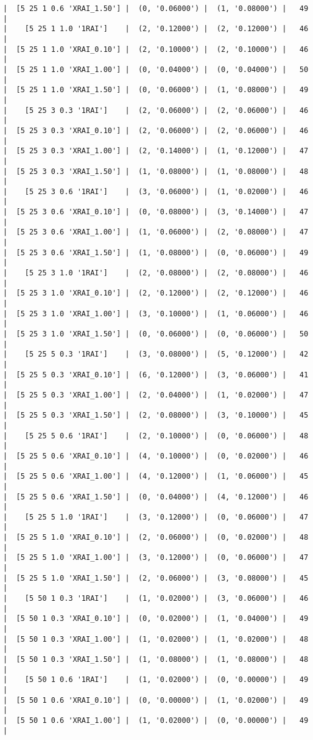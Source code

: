 \documentclass{article}
\begin{document}
\begin{verbatim}
|  [5 25 1 0.6 'XRAI_1.50'] |  (0, '0.06000') |  (1, '0.08000') |   49  |
|    [5 25 1 1.0 '1RAI']    |  (2, '0.12000') |  (2, '0.12000') |   46  |
|  [5 25 1 1.0 'XRAI_0.10'] |  (2, '0.10000') |  (2, '0.10000') |   46  |
|  [5 25 1 1.0 'XRAI_1.00'] |  (0, '0.04000') |  (0, '0.04000') |   50  |
|  [5 25 1 1.0 'XRAI_1.50'] |  (0, '0.06000') |  (1, '0.08000') |   49  |
|    [5 25 3 0.3 '1RAI']    |  (2, '0.06000') |  (2, '0.06000') |   46  |
|  [5 25 3 0.3 'XRAI_0.10'] |  (2, '0.06000') |  (2, '0.06000') |   46  |
|  [5 25 3 0.3 'XRAI_1.00'] |  (2, '0.14000') |  (1, '0.12000') |   47  |
|  [5 25 3 0.3 'XRAI_1.50'] |  (1, '0.08000') |  (1, '0.08000') |   48  |
|    [5 25 3 0.6 '1RAI']    |  (3, '0.06000') |  (1, '0.02000') |   46  |
|  [5 25 3 0.6 'XRAI_0.10'] |  (0, '0.08000') |  (3, '0.14000') |   47  |
|  [5 25 3 0.6 'XRAI_1.00'] |  (1, '0.06000') |  (2, '0.08000') |   47  |
|  [5 25 3 0.6 'XRAI_1.50'] |  (1, '0.08000') |  (0, '0.06000') |   49  |
|    [5 25 3 1.0 '1RAI']    |  (2, '0.08000') |  (2, '0.08000') |   46  |
|  [5 25 3 1.0 'XRAI_0.10'] |  (2, '0.12000') |  (2, '0.12000') |   46  |
|  [5 25 3 1.0 'XRAI_1.00'] |  (3, '0.10000') |  (1, '0.06000') |   46  |
|  [5 25 3 1.0 'XRAI_1.50'] |  (0, '0.06000') |  (0, '0.06000') |   50  |
|    [5 25 5 0.3 '1RAI']    |  (3, '0.08000') |  (5, '0.12000') |   42  |
|  [5 25 5 0.3 'XRAI_0.10'] |  (6, '0.12000') |  (3, '0.06000') |   41  |
|  [5 25 5 0.3 'XRAI_1.00'] |  (2, '0.04000') |  (1, '0.02000') |   47  |
|  [5 25 5 0.3 'XRAI_1.50'] |  (2, '0.08000') |  (3, '0.10000') |   45  |
|    [5 25 5 0.6 '1RAI']    |  (2, '0.10000') |  (0, '0.06000') |   48  |
|  [5 25 5 0.6 'XRAI_0.10'] |  (4, '0.10000') |  (0, '0.02000') |   46  |
|  [5 25 5 0.6 'XRAI_1.00'] |  (4, '0.12000') |  (1, '0.06000') |   45  |
|  [5 25 5 0.6 'XRAI_1.50'] |  (0, '0.04000') |  (4, '0.12000') |   46  |
|    [5 25 5 1.0 '1RAI']    |  (3, '0.12000') |  (0, '0.06000') |   47  |
|  [5 25 5 1.0 'XRAI_0.10'] |  (2, '0.06000') |  (0, '0.02000') |   48  |
|  [5 25 5 1.0 'XRAI_1.00'] |  (3, '0.12000') |  (0, '0.06000') |   47  |
|  [5 25 5 1.0 'XRAI_1.50'] |  (2, '0.06000') |  (3, '0.08000') |   45  |
|    [5 50 1 0.3 '1RAI']    |  (1, '0.02000') |  (3, '0.06000') |   46  |
|  [5 50 1 0.3 'XRAI_0.10'] |  (0, '0.02000') |  (1, '0.04000') |   49  |
|  [5 50 1 0.3 'XRAI_1.00'] |  (1, '0.02000') |  (1, '0.02000') |   48  |
|  [5 50 1 0.3 'XRAI_1.50'] |  (1, '0.08000') |  (1, '0.08000') |   48  |
|    [5 50 1 0.6 '1RAI']    |  (1, '0.02000') |  (0, '0.00000') |   49  |
|  [5 50 1 0.6 'XRAI_0.10'] |  (0, '0.00000') |  (1, '0.02000') |   49  |
|  [5 50 1 0.6 'XRAI_1.00'] |  (1, '0.02000') |  (0, '0.00000') |   49  |

\end{verbatim}
\end{document}

